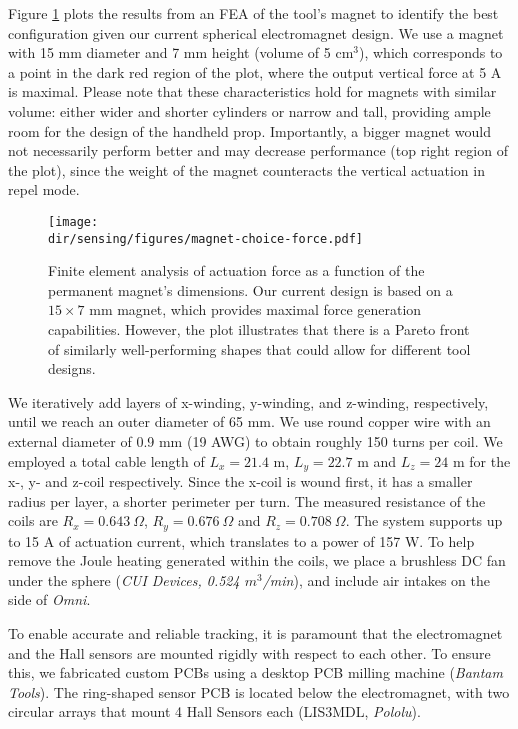 Figure \ref{fig:comsol} plots the results from an FEA of the tool's magnet to identify the best configuration given our current spherical electromagnet design. We use a magnet with 15 mm diameter and 7 mm height (volume of 5 cm$^3$), which corresponds to a point in the dark red region of the plot, where the output vertical force at 5 A is maximal. Please note that these characteristics hold for magnets with similar volume: either wider and shorter cylinders or narrow and tall, providing ample room for the design of the handheld prop. Importantly, a bigger magnet would not necessarily perform better and may decrease performance (top right region of the plot), since the weight of the magnet counteracts the vertical actuation in repel mode.
\begin{figure}[!t]
\centering
\texttt{[image: \\dir/sensing/figures/magnet-choice-force.pdf]}
\caption{Finite element analysis of actuation force as a function of the permanent magnet's dimensions. Our current design is based on a $15\times7$ mm magnet, which provides maximal force generation capabilities. However, the plot illustrates that there is a Pareto front of similarly well-performing shapes that could allow for different tool designs.}
\label{fig:comsol}
\end{figure}

We iteratively add layers of x-winding, y-winding, and z-winding, respectively, until we reach an outer diameter of 65 mm. We use round copper wire with an external diameter of 0.9 mm (19 AWG) to obtain roughly 150 turns per coil. We employed a total cable length of $L_x = 21.4$ m, $L_y = 22.7$ m and $L_z = 24$ m for the x-, y- and z-coil respectively.
Since the x-coil is wound first, it has a smaller radius per layer, \ie a shorter perimeter per turn. The measured resistance of the coils are $R_x = 0.643 \ \Omega$, $R_y = 0.676 \ \Omega$ and $R_z = 0.708 \ \Omega$. The system supports up to 15 A of actuation current, which translates to a power of 157 W. To help remove the Joule heating generated within the coils, we place a brushless DC fan under the sphere (\emph{CUI Devices, 0.524 $m^3$/min}), and include air intakes on the side of \textit{Omni}.

To enable accurate and reliable tracking, it is paramount that the electromagnet and the Hall sensors are mounted rigidly with respect to each other. To ensure this, we fabricated custom PCBs using a desktop PCB milling machine (\emph{Bantam Tools}). The ring-shaped sensor PCB is located below the electromagnet, with two circular arrays that mount 4 Hall Sensors each (LIS3MDL, \emph{Pololu}).

